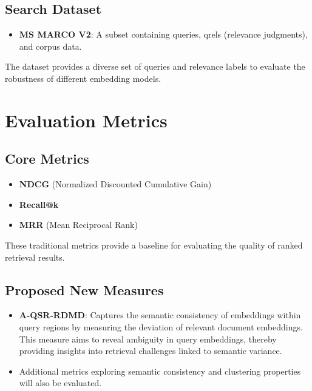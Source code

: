\documentclass{article}
\begin{document}
\subsection{Search Dataset}
\begin{itemize}
    \item \textbf{MS MARCO V2}: A subset containing queries, qrels (relevance judgments), and corpus data.
\end{itemize}
The dataset provides a diverse set of queries and relevance labels to evaluate the robustness of different embedding models.

\section{Evaluation Metrics}
\subsection{Core Metrics}
\begin{itemize}
    \item \textbf{NDCG} (Normalized Discounted Cumulative Gain)
    \item \textbf{Recall@k}
    \item \textbf{MRR} (Mean Reciprocal Rank)
\end{itemize}
These traditional metrics provide a baseline for evaluating the quality of ranked retrieval results.

\subsection{Proposed New Measures}
\begin{itemize}
    \item \textbf{A-QSR-RDMD}: Captures the semantic consistency of embeddings within query regions by measuring the deviation of relevant document embeddings. This measure aims to reveal ambiguity in query embeddings, thereby providing insights into retrieval challenges linked to semantic variance.
    \item Additional metrics exploring semantic consistency and clustering properties will also be evaluated.
\end{itemize}
\end{document}
